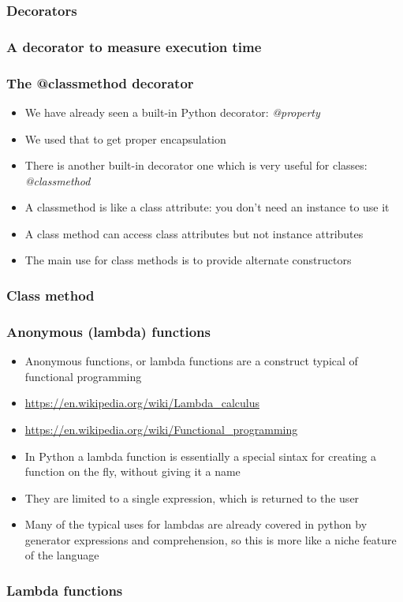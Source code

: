 \documentclass[9pt]{beamer}
\begin{document}
\begin{frame}
  \frametitle{Decorators}
  
\end{frame}


\begin{frame}
  \frametitle{A decorator to measure execution time}
  
\end{frame}


\begin{frame}
  \frametitle{The @classmethod decorator}
  \begin{itemize}
    \item We have already seen a built-in Python decorator: \emph{@property}
    \item We used that to get proper encapsulation
    \item There is another built-in decorator one which is very useful for classes: \alert{\emph{@classmethod}}
    \item A classmethod is like a class attribute: you don't need an instance to
          use it
    \item A class method can access class attributes but not instance attributes
    \item The main use for class methods is to provide \alert{alternate constructors}
  \end{itemize}
  
\end{frame}


\begin{frame}
  \frametitle{Class method}
  
\end{frame}


\begin{frame}
  \frametitle{Anonymous (lambda) functions}
  \begin{itemize}
    \item \alert{Anonymous functions}, or \alert{lambda functions} are a construct typical of \alert{functional programming}
    \item \url{https://en.wikipedia.org/wiki/Lambda_calculus}
    \item \url{https://en.wikipedia.org/wiki/Functional_programming}
    \item In Python a lambda function is essentially a special sintax for creating a function
          on the fly, without giving it a name
    \item They are limited to \alert{a single expression}, which is returned to the user
    \item Many of the typical uses for lambdas are already covered in python by generator expressions and comprehension,
          so this is more like a niche feature of the language
  \end{itemize}
  
\end{frame}


\begin{frame}
  \frametitle{Lambda functions}
  
\end{frame}
\end{document}
